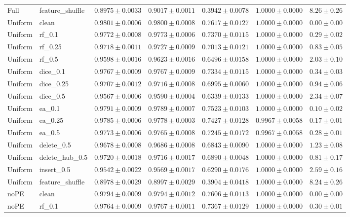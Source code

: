 \documentclass[UTF8,a4paper,11pt,fontset=fandol]{ctexart}
\begin{document}
{\begin{longtable}{llrrrrr}
Full & feature\_shuffle & $0.8975\pm0.0033$ & $0.9017\pm0.0011$ & $0.3942\pm0.0078$ & $1.0000\pm0.0000$ & $8.26\pm0.26$ \\
Uniform & clean & $0.9801\pm0.0006$ & $0.9800\pm0.0008$ & $0.7617\pm0.0127$ & $1.0000\pm0.0000$ & $0.00\pm0.00$ \\
Uniform & rf\_0.1 & $0.9772\pm0.0008$ & $0.9773\pm0.0006$ & $0.7370\pm0.0115$ & $1.0000\pm0.0000$ & $0.29\pm0.02$ \\
Uniform & rf\_0.25 & $0.9718\pm0.0011$ & $0.9727\pm0.0009$ & $0.7013\pm0.0121$ & $1.0000\pm0.0000$ & $0.83\pm0.05$ \\
Uniform & rf\_0.5 & $0.9598\pm0.0016$ & $0.9623\pm0.0016$ & $0.6496\pm0.0158$ & $1.0000\pm0.0000$ & $2.03\pm0.10$ \\
Uniform & dice\_0.1 & $0.9767\pm0.0009$ & $0.9767\pm0.0009$ & $0.7334\pm0.0115$ & $1.0000\pm0.0000$ & $0.34\pm0.03$ \\
Uniform & dice\_0.25 & $0.9707\pm0.0012$ & $0.9716\pm0.0008$ & $0.6995\pm0.0060$ & $1.0000\pm0.0000$ & $0.94\pm0.06$ \\
Uniform & dice\_0.5 & $0.9567\pm0.0006$ & $0.9590\pm0.0004$ & $0.6339\pm0.0133$ & $1.0000\pm0.0000$ & $2.34\pm0.07$ \\
Uniform & ea\_0.1 & $0.9791\pm0.0009$ & $0.9789\pm0.0007$ & $0.7523\pm0.0103$ & $1.0000\pm0.0000$ & $0.10\pm0.02$ \\
Uniform & ea\_0.25 & $0.9785\pm0.0006$ & $0.9778\pm0.0003$ & $0.7427\pm0.0128$ & $0.9967\pm0.0058$ & $0.17\pm0.01$ \\
Uniform & ea\_0.5 & $0.9773\pm0.0006$ & $0.9765\pm0.0008$ & $0.7245\pm0.0172$ & $0.9967\pm0.0058$ & $0.28\pm0.01$ \\
Uniform & delete\_0.5 & $0.9678\pm0.0008$ & $0.9686\pm0.0008$ & $0.6843\pm0.0090$ & $1.0000\pm0.0000$ & $1.23\pm0.08$ \\
Uniform & delete\_hub\_0.5 & $0.9720\pm0.0018$ & $0.9716\pm0.0017$ & $0.6890\pm0.0048$ & $1.0000\pm0.0000$ & $0.81\pm0.17$ \\
Uniform & insert\_0.5 & $0.9542\pm0.0022$ & $0.9569\pm0.0017$ & $0.6290\pm0.0176$ & $1.0000\pm0.0000$ & $2.59\pm0.16$ \\
Uniform & feature\_shuffle & $0.8978\pm0.0029$ & $0.8997\pm0.0029$ & $0.3904\pm0.0418$ & $1.0000\pm0.0000$ & $8.24\pm0.26$ \\
noPE & clean & $0.9794\pm0.0009$ & $0.9794\pm0.0012$ & $0.7606\pm0.0113$ & $1.0000\pm0.0000$ & $0.00\pm0.00$ \\
noPE & rf\_0.1 & $0.9764\pm0.0009$ & $0.9767\pm0.0011$ & $0.7367\pm0.0129$ & $1.0000\pm0.0000$ & $0.30\pm0.01$ \\

\end{longtable}}
\end{document}
